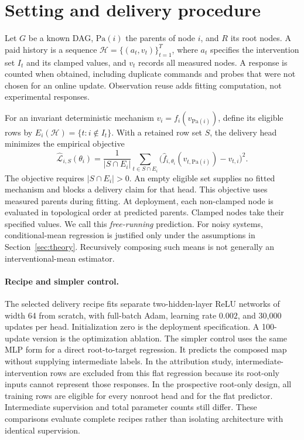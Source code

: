 \section{Setting and delivery procedure}
\label{sec:setting}
Let $G$ be a known DAG, $\mathrm{Pa}(i)$ the parents of node $i$, and $R$ its
root nodes. A paid history is a sequence
$\mathcal H=\{(a_t,v_t)\}_{t=1}^{T}$, where $a_t$ specifies the intervention
set $I_t$ and its clamped values, and $v_t$ records all measured nodes. A response
is counted when obtained, including duplicate commands and probes that were
not chosen for an online update. Observation reuse adds fitting computation,
not experimental responses.

For an invariant deterministic mechanism $v_i=f_i(v_{\mathrm{Pa}(i)})$, define
its eligible rows by $E_i(\mathcal H)=\{t:i\notin I_t\}$. With a retained row
set $S$, the delivery head minimizes the empirical objective
\begin{equation}
 \widehat{\mathcal L}_{i,S}(\theta_i)=
 \frac{1}{|S\cap E_i|}\sum_{t\in S\cap E_i}
 \bigl(\hat f_{i,\theta_i}(v_{t,\mathrm{Pa}(i)})-v_{t,i}\bigr)^2.
 \label{eq:local-objective}
\end{equation}
The objective requires $|S\cap E_i|>0$. An empty eligible set supplies no fitted
mechanism and blocks a delivery claim for that head. This objective uses measured parents during fitting. At deployment, each
non-clamped node is evaluated in topological order at predicted parents.
Clamped nodes take their specified values. We call this \emph{free-running}
prediction. For noisy systems, conditional-mean regression is justified only
under the assumptions in Section~\ref{sec:theory}. Recursively composing such
means is not generally an interventional-mean estimator.

\paragraph{Recipe and simpler control.}
The selected delivery recipe fits separate two-hidden-layer ReLU networks of
width 64 from scratch, with full-batch Adam, learning rate $0.002$, and 30,000
updates per head. Initialization zero is the deployment specification. A
100-update version is the optimization ablation. The simpler control uses the
same MLP form for a direct root-to-target regression. It predicts the composed
map without supplying intermediate labels. In the attribution study,
intermediate-intervention rows are excluded from this flat regression because
its root-only inputs cannot represent those responses. In the prospective
root-only design, all training rows are eligible for every nonroot head and
for the flat predictor. Intermediate supervision and total parameter counts
still differ. These comparisons evaluate complete recipes rather than isolating
architecture with identical supervision.


